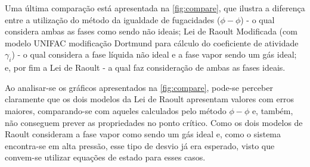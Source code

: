 Uma última comparação está apresentada na \autoref{fig:compare}, que ilustra
a diferença entre a utilização do método da igualdade de fugacidades
($\phi-\phi$) - o qual considera ambas as fases como sendo não ideais; Lei de
Raoult Modificada (com modelo UNIFAC modificação Dortmund \cite{Jakob2006} para
cálculo do coeficiente de atividade $\gamma_i$) - o qual considera a fase líquida não ideal
e a fase vapor sendo um gás ideal; e, por fim a Lei de Raoult - a qual faz 
consideração de ambas as fases ideais.

Ao analisar-se os gráficos apresentados na \autoref{fig:compare}, pode-se perceber
claramente que os dois modelos da Lei de Raoult apresentam
valores com erros maiores, comparando-se com aqueles calculados pelo método
$\phi-\phi$ e, também, não conseguem prever as propriedades no ponto crítico.
Como os dois modelos de Raoult consideram a fase vapor como sendo um gás ideal
e, como o sistema encontra-se em alta pressão, esse tipo de desvio já era esperado, visto
que convem-se utilizar equações de estado para esses casos.

\clearpage

